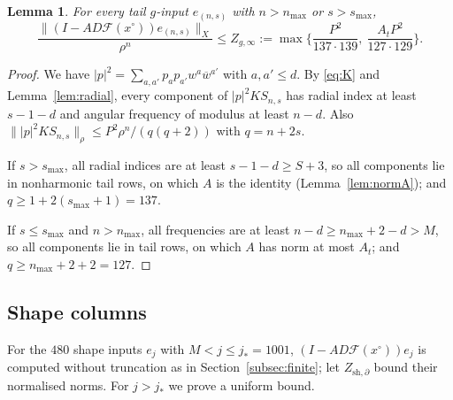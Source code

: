 \documentclass[11pt]{amsart}
\newtheorem{lemma}[theorem]{Lemma}
\theoremstyle{definition}
\theoremstyle{remark}
\numberwithin{equation}{section}
\newcommand{\Fc}{\mathcal{F}}
\newcommand{\bw}{\overline{w}}
\newcommand{\jst}{j_*}
\newcommand{\nrm}[1]{\lVert #1\rVert}
\begin{document}
\begin{lemma}\label{lem:gfar}
For every tail $g$-input $e_{(n,s)}$ with $n>n_{\max}$ or $s>s_{\max}$,
\[
\frac{\nrm{(I-AD\Fc(x^\circ))e_{(n,s)}}_X}{\rho^n}\leq Z_{g,\infty}:=\max\Big\{\frac{P^2}{137\cdot139},\ \frac{A_tP^2}{127\cdot129}\Big\}.
\]
\end{lemma}

\begin{proof}
We have $|p|^2=\sum_{a,a'}p_ap_{a'}w^a\bw^{a'}$ with $a,a'\leq d$. By \eqref{eq:K} and Lemma~\ref{lem:radial}, every component of $|p|^2KS_{n,s}$ has radial index at least $s-1-d$ and angular frequency of modulus at least $n-d$. Also $\nrm{|p|^2KS_{n,s}}_\rho\leq P^2\rho^n/(q(q+2))$ with $q=n+2s$.

If $s>s_{\max}$, all radial indices are at least $s-1-d\geq S+3$, so all components lie in nonharmonic tail rows, on which $A$ is the identity (Lemma~\ref{lem:normA}); and $q\geq1+2(s_{\max}+1)=137$.

If $s\leq s_{\max}$ and $n>n_{\max}$, all frequencies are at least $n-d\geq n_{\max}+2-d>M$, so all components lie in tail rows, on which $A$ has norm at most $A_t$; and $q\geq n_{\max}+2+2=127$.
\end{proof}

\subsection{Shape columns}
For the $480$ shape inputs $e_j$ with $M<j\leq\jst=1001$, $(I-AD\Fc(x^\circ))e_j$ is computed without truncation as in Section~\ref{subsec:finite}; let $Z_{\mathrm{sh},\partial}$ bound their normalised norms. For $j>\jst$ we prove a uniform bound.
\end{document}
